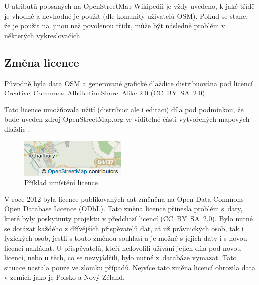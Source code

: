 U atributů popsaných na OpenStreetMap Wikipedii \cite{OSMfeatures} je vždy uvedeno, k jaké třídě je
vhodné a nevhodné je použít (dle komunity uživatelů OSM). Pokud se stane, že je použit
na~jinou než povolenou třídu, může být následně problém v některých vykreslovačích. 

\subsection{Změna licence}
\label{změna licence}

Původně byla data OSM a generované grafické dlaždice distribuována pod licencí
Creative~Commons~AllributionShare~Alike 2.0 (CC~BY~SA~2.0).

Tato licence umožňovala užití (distribuci ale i editaci) díla pod podmínkou,
že bude uveden zdroj OpenStreetMap.org ve viditelné části
vytvořených mapových dlaždic \cite{OSMlicence}.

  \begin{figure}[hbt]
    \centering
      \includegraphics{./pictures/attribution_example.png}
      \caption{Příklad umístění licence}
      \label{fig:attribution_example}
  \end{figure} 
V roce 2012 byla licence publikovaných dat změněna na Open Data Commons
Open Database Licence (ODbL).
Tato změna licence přinesla problém
s~daty, které byly poskytnuty projektu v předchozí licencí
(CC~BY~SA~2.0). Bylo nutné se dotázat každého z dřívějších
přispěvatelů dat, ať už právnických osob, tak i fyzických osob, jestli
s touto změnou souhlasí a je možné s jejich daty i s novou licencí
nakládat. U přispěvatelů, kteří nedovolili užívání jejich díla
pod novou licencí, nebo u těch, co se nevyjádřili, bylo nutné
z~databáze vymazat. Tato situace nastala pouze ve zlomku případů.
Nejvíce tato změna licencí ohrozila data v zemích jako je Polsko a Nový Zéland.

